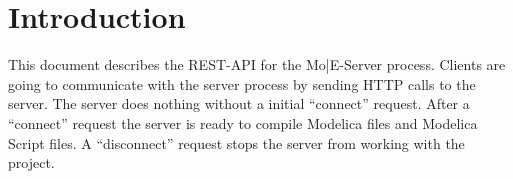 \section{Introduction}
This document describes the REST-API for the Mo|E-Server process.
Clients are going to communicate with the server process by sending HTTP calls to the server.
The server does nothing without a initial ``connect'' request. After a ``connect'' request the server
is ready to compile Modelica files and Modelica Script files. A ``disconnect'' request stops the server
from working with the project.
